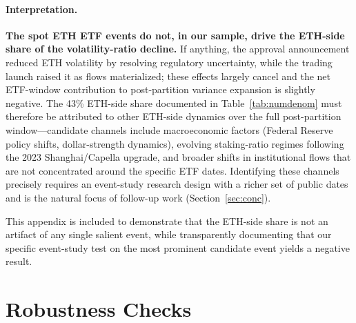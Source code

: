 \documentclass[11pt,a4paper]{article}
\begin{document}
\paragraph{Interpretation.} \textbf{The spot ETH ETF events do not, in our sample, drive the ETH-side share of the volatility-ratio decline.} If anything, the approval announcement reduced ETH volatility by resolving regulatory uncertainty, while the trading launch raised it as flows materialized; these effects largely cancel and the net ETF-window contribution to post-partition variance expansion is slightly negative. The 43\% ETH-side share documented in Table~\ref{tab:numdenom} must therefore be attributed to other ETH-side dynamics over the full post-partition window---candidate channels include macroeconomic factors (Federal Reserve policy shifts, dollar-strength dynamics), evolving staking-ratio regimes following the 2023 Shanghai/Capella upgrade, and broader shifts in institutional flows that are not concentrated around the specific ETF dates. Identifying these channels precisely requires an event-study research design with a richer set of public dates and is the natural focus of follow-up work (Section~\ref{sec:conc}).

This appendix is included to demonstrate that the ETH-side share is not an artifact of any single salient event, while transparently documenting that our specific event-study test on the most prominent candidate event yields a negative result.

\section{Robustness Checks} \label{app:robust}
\end{document}
